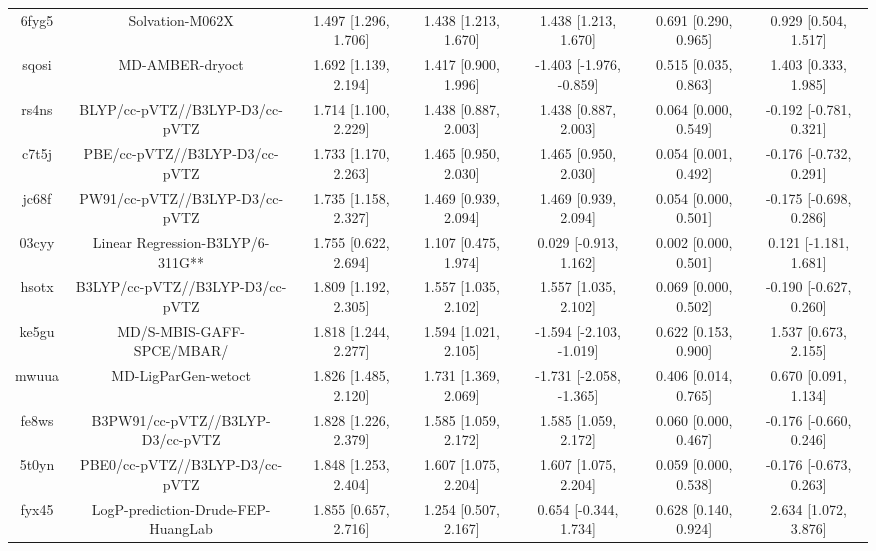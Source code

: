 \documentclass{article}
\begin{document}
\begin{center}
\begin{longtable}{|ccccccc|}
 6fyg5 &                                    Solvation-M062X &  1.497 [1.296, 1.706] &  1.438 [1.213, 1.670] &     1.438 [1.213, 1.670] &  0.691 [0.290, 0.965] &    0.929 [0.504, 1.517] \\
 sqosi &                                    MD-AMBER-dryoct &  1.692 [1.139, 2.194] &  1.417 [0.900, 1.996] &  -1.403 [-1.976, -0.859] &  0.515 [0.035, 0.863] &    1.403 [0.333, 1.985] \\
 rs4ns &                     BLYP/cc-pVTZ//B3LYP-D3/cc-pVTZ &  1.714 [1.100, 2.229] &  1.438 [0.887, 2.003] &     1.438 [0.887, 2.003] &  0.064 [0.000, 0.549] &  -0.192 [-0.781, 0.321] \\
 c7t5j &                      PBE/cc-pVTZ//B3LYP-D3/cc-pVTZ &  1.733 [1.170, 2.263] &  1.465 [0.950, 2.030] &     1.465 [0.950, 2.030] &  0.054 [0.001, 0.492] &  -0.176 [-0.732, 0.291] \\
 jc68f &                     PW91/cc-pVTZ//B3LYP-D3/cc-pVTZ &  1.735 [1.158, 2.327] &  1.469 [0.939, 2.094] &     1.469 [0.939, 2.094] &  0.054 [0.000, 0.501] &  -0.175 [-0.698, 0.286] \\
 03cyy &                   Linear Regression-B3LYP/6-311G** &  1.755 [0.622, 2.694] &  1.107 [0.475, 1.974] &    0.029 [-0.913, 1.162] &  0.002 [0.000, 0.501] &   0.121 [-1.181, 1.681] \\
 hsotx &                    B3LYP/cc-pVTZ//B3LYP-D3/cc-pVTZ &  1.809 [1.192, 2.305] &  1.557 [1.035, 2.102] &     1.557 [1.035, 2.102] &  0.069 [0.000, 0.502] &  -0.190 [-0.627, 0.260] \\
 ke5gu &                          MD/S-MBIS-GAFF-SPCE/MBAR/ &  1.818 [1.244, 2.277] &  1.594 [1.021, 2.105] &  -1.594 [-2.103, -1.019] &  0.622 [0.153, 0.900] &    1.537 [0.673, 2.155] \\
 mwuua &                                MD-LigParGen-wetoct &  1.826 [1.485, 2.120] &  1.731 [1.369, 2.069] &  -1.731 [-2.058, -1.365] &  0.406 [0.014, 0.765] &    0.670 [0.091, 1.134] \\
 fe8ws &                   B3PW91/cc-pVTZ//B3LYP-D3/cc-pVTZ &  1.828 [1.226, 2.379] &  1.585 [1.059, 2.172] &     1.585 [1.059, 2.172] &  0.060 [0.000, 0.467] &  -0.176 [-0.660, 0.246] \\
 5t0yn &                     PBE0/cc-pVTZ//B3LYP-D3/cc-pVTZ &  1.848 [1.253, 2.404] &  1.607 [1.075, 2.204] &     1.607 [1.075, 2.204] &  0.059 [0.000, 0.538] &  -0.176 [-0.673, 0.263] \\
 fyx45 &                 LogP-prediction-Drude-FEP-HuangLab &  1.855 [0.657, 2.716] &  1.254 [0.507, 2.167] &    0.654 [-0.344, 1.734] &  0.628 [0.140, 0.924] &    2.634 [1.072, 3.876] \\

\end{longtable}
\end{center}
\end{document}
